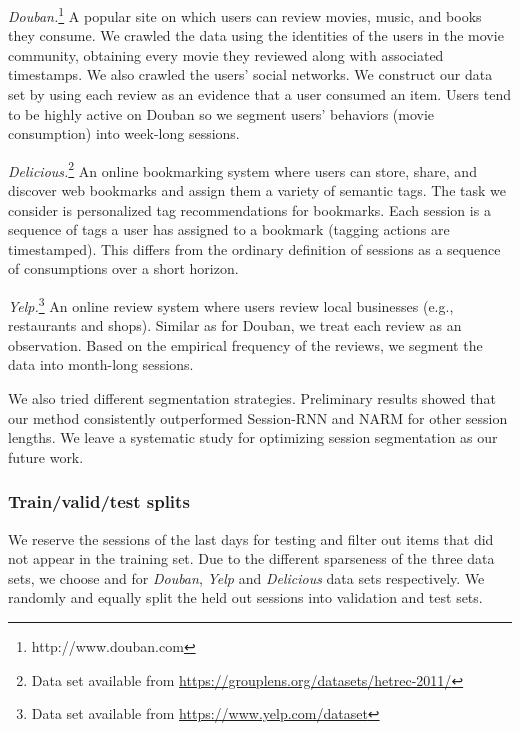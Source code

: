 \documentclass[sigconf]{acmart}
\begin{document}
\textit{Douban.}\footnote{http://www.douban.com} A popular site on which users can review movies, music, and books they consume. We crawled the data using the identities of the users in the movie community, obtaining every movie they reviewed along with associated timestamps. We also crawled the users' social networks. We construct our data set by using each review as an evidence that a user consumed an item. Users tend to be highly active on Douban so we segment users' behaviors (movie consumption) into week-long sessions.

\textit{Delicious.}\footnote{Data set available from {\url{https://grouplens.org/datasets/hetrec-2011/}}} An online bookmarking system where users can store, share, and discover web bookmarks and assign them a variety of semantic tags. The task we consider is personalized tag recommendations for bookmarks. Each session is a sequence of tags a user has assigned to a bookmark (tagging actions are timestamped). This differs from the ordinary definition of sessions as a sequence of consumptions over a short horizon.


\textit{Yelp.}\footnote{Data set available from {\url{https://www.yelp.com/dataset}}}
An online review system where users review local businesses (e.g., restaurants and shops). Similar as for Douban, we treat each review as an observation. Based on the empirical frequency of the reviews, we segment the data into month-long sessions.

We also tried different segmentation strategies. Preliminary results showed that our method consistently outperformed Session-RNN and NARM for other session lengths. We leave a systematic study for optimizing session segmentation as our future work.

\subsubsection{Train/valid/test splits} We reserve the sessions of the last  days for testing and filter out items that did not appear in the training set. Due to the different sparseness of the three data sets, we choose  and  for \textit{Douban}, \textit{Yelp} and \textit{Delicious} data sets respectively. We randomly and equally split the held out sessions into validation and test sets.
\end{document}
